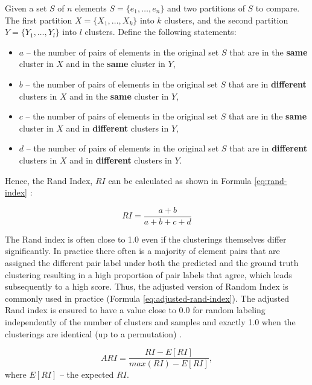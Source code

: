 \documentclass[thesis=M,english]{FITthesis}[2019/12/23]
\begin{document}
Given a set \(S\) of \(n\) elements \(S = \{e_1,\dots,e_n\}\) and two partitions of \(S\) to compare. The first partition \(X = \{X_1,\dots,X_k\}\) into \(k\) clusters, and the second partition \(Y = \{Y_1,\dots,Y_l\}\) into \(l\) clusters. Define the following statements:
\begin{itemize}
	\item \(a\) -- the number of pairs of elements in the original set \(S\) that are in the \textbf{same} cluster in \(X\) and in the \textbf{same} cluster in \(Y\),
	\item \(b\) -- the number of pairs of elements in the original set \(S\) that are in \textbf{different} clusters in \(X\) and in the \textbf{same} cluster in \(Y\),
	\item \(c\) -- the number of pairs of elements in the original set \(S\) that are in the \textbf{same} cluster in \(X\) and in \textbf{different} clusters in \(Y\),
	\item \(d\) -- the number of pairs of elements in the original set \(S\) that are in \textbf{different} clusters in \(X\) and in \textbf{different} clusters in \(Y\).
\end{itemize}

Hence, the Rand Index, \(RI\) can be calculated as shown in Formula \ref{eq:rand-index} \cite{rand-index}:

\begin{equation}\label{eq:rand-index}
	RI = \frac{a + b}{a + b + c + d}
\end{equation}

The Rand index is often close to 1.0 even if the clusterings themselves differ significantly. In practice there often is a majority of element pairs that are assigned the different pair label under both the predicted and the ground truth clustering resulting in a high proportion of pair labels that agree, which leads subsequently to a high score\cite{quality-metrics}. Thus, the adjusted version of Random Index is commonly used in practice (Formula \ref{eq:adjusted-rand-index}). The adjusted Rand index is ensured to have a value close to 0.0 for random labeling independently of the number of clusters and samples and exactly 1.0 when the clusterings are identical (up to a permutation) \cite{adjusted-rand-index}.

\begin{equation}\label{eq:adjusted-rand-index}
	ARI = \frac{RI - E[RI]}{max(RI) - E[RI]},
\end{equation}
where \(E[RI]\) -- the expected \(RI\).
\end{document}
